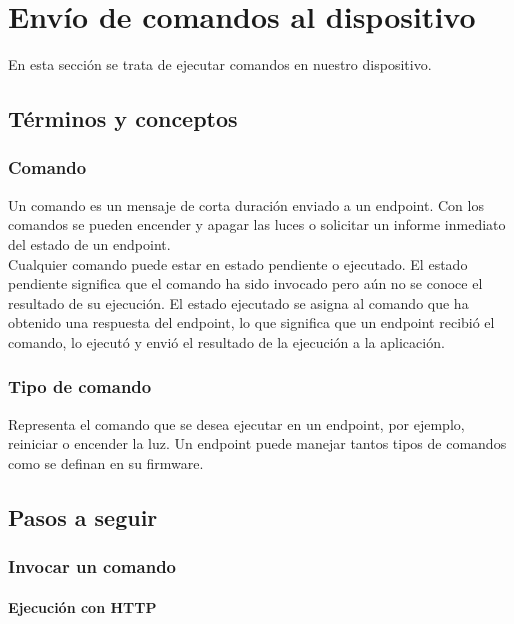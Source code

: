 {\section{Envío de comandos al dispositivo}

En esta sección se trata de ejecutar comandos en nuestro dispositivo.

\subsection{Términos y conceptos}

\subsubsection{Comando}

Un comando es un mensaje de corta duración enviado a un endpoint. Con los comandos se pueden encender y apagar las luces o solicitar un informe inmediato del estado de un endpoint.\\

Cualquier comando puede estar en estado pendiente o ejecutado. El estado pendiente significa que el comando ha sido invocado pero aún no se conoce el resultado de su ejecución. El estado ejecutado se asigna al comando que ha obtenido una respuesta del endpoint, lo que significa que un endpoint recibió el comando, lo ejecutó y envió el resultado de la ejecución a la aplicación.\\

\subsubsection{Tipo de comando}

Representa el comando que se desea ejecutar en un endpoint, por ejemplo, reiniciar o encender la luz. Un endpoint puede manejar tantos tipos de comandos como se definan en su firmware.

\subsection{Pasos a seguir}

\subsubsection{Invocar un comando}

\paragraph{Ejecución con HTTP}  \hspace{0pt} \\

}

